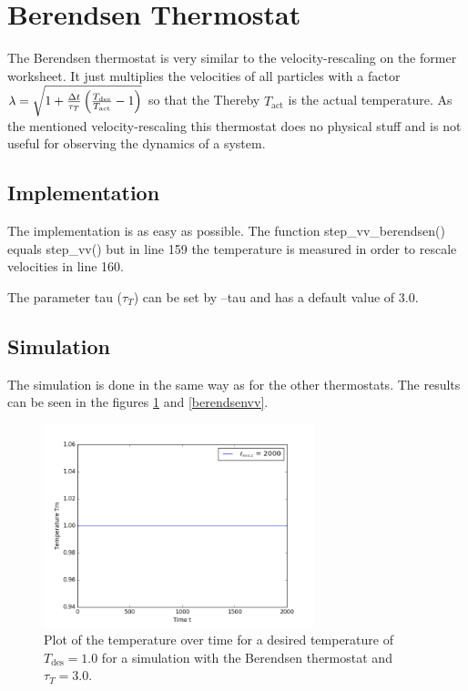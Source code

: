 \section{Berendsen Thermostat}

The Berendsen thermostat is very similar to the velocity-rescaling on the former worksheet.
It just multiplies the velocities of all particles with a factor $\lambda =\sqrt{1+\frac{\Delta t}{\tau_T}\left(\frac{T_\text{des}}{T_\text{act}}-1\right) }$ so that the 
Thereby $T_\text{act}$ is the actual temperature. 
As the mentioned velocity-rescaling this thermostat does no physical stuff and is not useful for observing the dynamics of a system.

\subsection{Implementation}

The implementation is as easy as possible.
The function step\_vv\_berendsen() equals step\_vv() but in line 159 the temperature is measured in order to rescale velocities in line 160.


The parameter tau ($\tau_T$) can be set by --tau and has a default value of 3.0.

\subsection{Simulation}

The simulation is done in the same way as for the other thermostats. 
The results can be seen in the figures \ref{berendsenT} and \ref{berendsenvv}.

\begin{figure}[ht]
	\centering
	\includegraphics[width=0.7\textwidth]{../dat/berendsen_T1d0_tau3d0_Tm.png}
	\caption{
		Plot of the temperature over time for a desired temperature of $T_\text{des}=1.0$ for a simulation with the Berendsen thermostat and $\tau_T =3.0$.
	}
	\label{berendsenT}
\end{figure}

